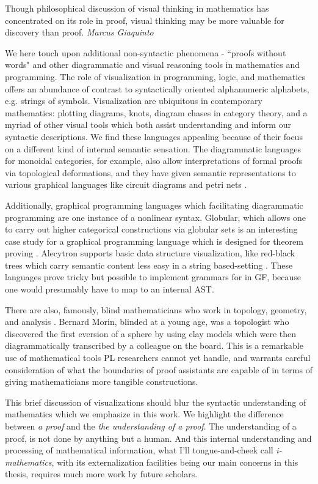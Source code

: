 \begin{displayquote}
Though philosophical discussion of visual thinking in mathematics has
concentrated on its role in proof, visual thinking may be more valuable for
discovery than proof. \emph{Marcus Giaquinto} \cite{sep-epistemology-visual-thinking}
\end{displayquote}

We here touch upon additional non-syntactic phenomena - ``proofs without words"
\cite{proofWW} and other diagrammatic and visual reasoning tools in mathematics
and programming. The role of visualization in programming, logic, and
mathematics offers an abundance of contrast to syntactically oriented
alphanumeric alphabets, e.g. strings of symbols. Visualization are ubiquitous in
contemporary mathematics: plotting diagrams, knots, diagram chases in category
theory, and a myriad of other visual tools which both assist understanding and
inform our syntactic descriptions. We find these languages appealing because of
their focus on a different kind of internal semantic sensation. The diagrammatic
languages for monoidal categories, for example, also allow interpretations of
formal proofs via topological deformations, and they have given semantic
representations to various graphical languages like circuit diagrams and petri
nets \cite{fong2016algebra}.

Additionally, graphical programming languages which facilitating diagrammatic programming are
one instance of a nonlinear syntax. Globular, which allows one to carry out
higher categorical constructions via globular sets is an interesting case study
for a graphical programming language which is designed for theorem proving
\cite{Bar2016GlobularAO}. Alecytron supports basic data structure visualization,
like red-black trees which carry semantic content less easy in a string
based-setting \cite{coqAlec}. These languages prove tricky but possible to
implement grammars for in GF, because one would presumably have to map to an
internal AST.

There are also, famously, blind mathematicians who work in topology, geometry,
and analysis \cite{2002TheWO}. Bernard Morin, blinded at a young age, was a
topologist who discovered the first eversion of a sphere by using clay models
which were then diagrammatically transcribed by a colleague on the board. This
is a remarkable use of mathematical tools PL researchers cannot yet handle, and
warrants careful consideration of what the boundaries of proof assistants are
capable of in terms of giving mathematicians more tangible constructions.

This brief discussion of visualizations should blur the syntactic understanding
of mathematics which we emphasize in this work. We highlight the difference
between \emph{a proof} and the \emph{the understanding of a proof}. The
understanding of a proof, is not done by anything but a human. And this internal
understanding and processing of mathematical information, what I'll
tongue-and-cheek call \emph{i-mathematics}, with its externalization facilities
being our main concerns in this thesis, requires much more work by future
scholars.